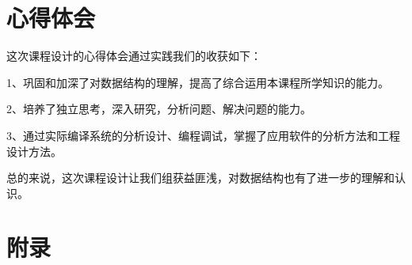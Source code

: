 \documentclass{DateStructure}
\begin{document}
\section{心得体会}
这次课程设计的心得体会通过实践我们的收获如下：\par
1、巩固和加深了对数据结构的理解，提高了综合运用本课程所学知识的能力。\par
2、培养了独立思考，深入研究，分析问题、解决问题的能力。\par
3、通过实际编译系统的分析设计、编程调试，掌握了应用软件的分析方法和工程设计方法。\par
总的来说，这次课程设计让我们组获益匪浅，对数据结构也有了进一步的理解和认识。\par

\newpage 
\section{附录}

\end{document}

